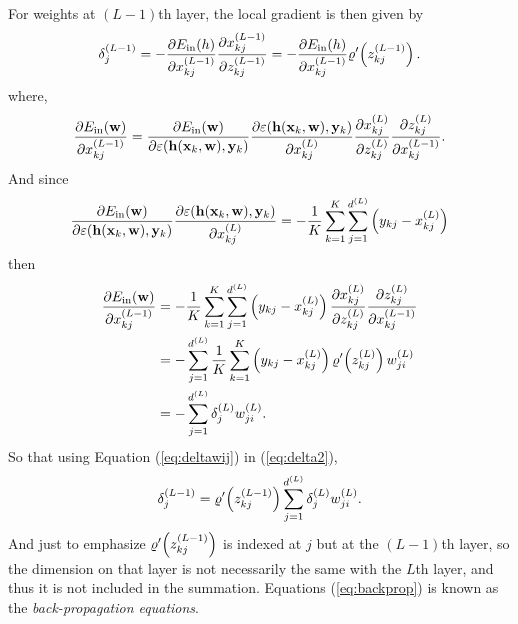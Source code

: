 For weights at $(L-1)$th layer, the local gradient is then given by
\begin{equation}\label{eq:delta2}
\delta_{j}^{(L-1)}=-\frac{\partial E_{\mathrm{in}}(h)}{\partial x_{kj}^{(L-1)}}\frac{\partial x_{kj}^{(L-1)}}{\partial z_{kj}^{(L-1)}}=-\frac{\partial E_{\mathrm{in}}(h)}{\partial x_{kj}^{(L-1)}}\varrho'\!\left(z_{kj}^{(L-1)}\right).
\end{equation}
where,
\begin{equation}
\frac{\partial E_{\mathrm{in}}(\mathbf{w})}{\partial x_{kj}^{(L-1)}}=\frac{\partial E_{\mathrm{in}}(\mathbf{w})}{\partial \varepsilon(\mathbf{h}(\mathbf{x}_k,\mathbf{w}),\mathbf{y}_{k})}\frac{\partial \varepsilon(\mathbf{h}(\mathbf{x}_k,\mathbf{w}),\mathbf{y}_{k})}{\partial x_{kj}^{(L)}}\frac{\partial x_{kj}^{(L)}}{\partial z_{kj}^{(L)}}\frac{\partial z_{kj}^{(L)}}{\partial x_{kj}^{(L-1)}}.
\end{equation}
And since
\begin{equation}
\frac{\partial E_{\mathrm{in}}(\mathbf{w})}{\partial \varepsilon(\mathbf{h}(\mathbf{x}_k,\mathbf{w}),\mathbf{y}_{k})}\frac{\partial \varepsilon(\mathbf{h}(\mathbf{x}_k,\mathbf{w}),\mathbf{y}_{k})}{\partial x_{kj}^{(L)}}=-\frac{1}{K}\sum_{k=1}^{K}\sum_{j=1}^{d^{(L)}}\left(y_{kj}-x_{kj}^{(L)}\right)
\end{equation}
then
\begin{align}
\frac{\partial E_{\mathrm{in}}(\mathbf{w})}{\partial x_{kj}^{(L-1)}}&=-\frac{1}{K}\sum_{k=1}^{K}\sum_{j=1}^{d^{(L)}}\left(y_{kj}-x_{kj}^{(L)}\right)\frac{\partial x_{kj}^{(L)}}{\partial z_{kj}^{(L)}}\frac{\partial z_{kj}^{(L)}}{\partial x_{kj}^{(L-1)}}\nonumber\\
&=-\sum_{j=1}^{d^{(L)}}\frac{1}{K}\sum_{k=1}^{K}\left(y_{kj}-x_{kj}^{(L)}\right)\varrho'\!\left(z_{kj}^{(L)}\right)w_{ji}^{(L)}\nonumber\\
&=-\sum_{j=1}^{d^{(L)}}\delta_j^{(L)}w_{ji}^{(L)}.\label{eq:deltawij}
\end{align}
So that using Equation (\ref{eq:deltawij}) in (\ref{eq:delta2}),
\begin{equation}\label{eq:backprop}
\delta_{j}^{(L-1)}=\varrho'\!\left(z_{kj}^{(L-1)}\right)\sum_{j=1}^{d^{(L)}}\delta_j^{(L)}w_{ji}^{(L)}.
\end{equation}
And just to emphasize $\varrho'\!\left(z_{kj}^{(L-1)}\right)$ is indexed at $j$ but at the $(L-1)$th layer, so the dimension on that layer is not necessarily the same with the $L$th layer, and thus it is not included in the summation. Equations (\ref{eq:backprop}) is known as the \textit{back-propagation equations}.

